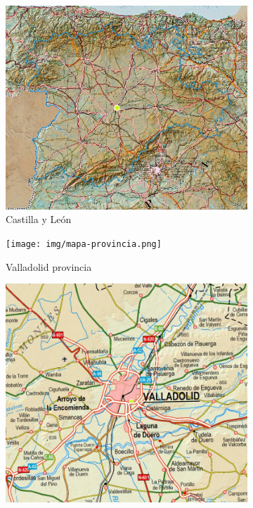 \begin{figure}[H]
    \centering
    \begin{subfigure}[H]{0.45\textwidth}
        \centering
        \includegraphics*[width=\textwidth]{img/mapa-comunidad.png}
        \caption{Castilla y León}
    \end{subfigure}
    \hfill
    \begin{subfigure}[H]{0.45\textwidth}
        \centering
        \texttt{[image: img/mapa-provincia.png]}
        \caption{Valladolid provincia}
    \end{subfigure}
    \hfill
    \begin{subfigure}[H]{0.45\textwidth}
        \centering
        \includegraphics*[width=\textwidth]{img/mapa-ciudad.png}

\end{subfigure}
\end{figure}
